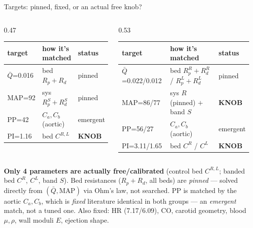 \documentclass[aspectratio=169]{beamer}
\begin{document}
\begin{frame}{Targets: pinned, fixed, or an actual free knob?}
\scriptsize
\begin{columns}[T]
\begin{column}{0.47\textwidth}
\smallskip
\begin{tabular}{@{}lll@{}}
\toprule
target & how it's matched & status \\
\midrule
$\bar Q$=0.016 & bed $R_p{+}R_d$ & pinned \\
MAP=92 & sys $R_p^{S}{+}R_d^{S}$ & pinned \\
PP=42 & $C_a,C_b$ (aortic) & emergent \\
PI=1.16 & bed $C^{R,L}$ & \textbf{KNOB} \\
\bottomrule
\end{tabular}
\end{column}
\begin{column}{0.53\textwidth}
\smallskip
\begin{tabular}{@{}lll@{}}
\toprule
target & how it's matched & status \\
\midrule
$\bar Q$=0.022/0.012 & bed $R_p^{R}{+}R_d^{R}$ / $R_p^{L}{+}R_d^{L}$ & pinned \\
MAP=86/77 & sys $R$ (pinned) $+$ band $S$ & \textbf{KNOB} \\
PP=56/27 & $C_a,C_b$ (aortic) & emergent \\
PI=3.11/1.65 & bed $C^{R}$ / $C^{L}$ & \textbf{KNOB} \\
\bottomrule
\end{tabular}
\end{column}
\end{columns}
\vspace{0.8em}
\centering\scriptsize
\textbf{Only 4 parameters are actually free/calibrated} (control bed $C^{R,L}$;
banded bed $C^{R}$, $C^{L}$, band $S$). Bed resistances ($R_p{+}R_d$, all beds)
are \emph{pinned} --- solved directly from $(\bar Q,\text{MAP})$ via Ohm's law,
not searched. PP is matched by the aortic $C_a,C_b$, which is \emph{fixed}
literature identical in both groups --- an \emph{emergent} match, not a tuned
one. \; Also fixed: HR (7.17/6.09), CO, carotid geometry, blood $\mu,\rho$,
wall moduli $E$, ejection shape.
\end{frame}
\end{document}
